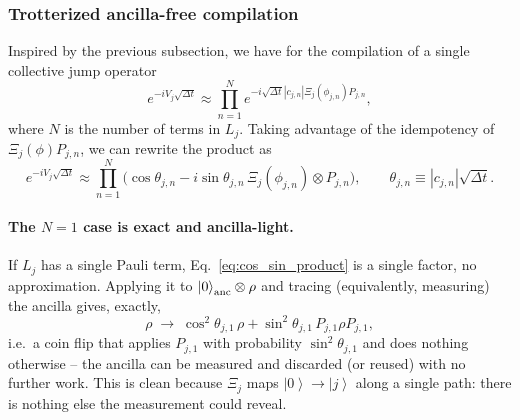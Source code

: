 \documentclass[11pt]{article}
\newcommand{\Dt}{\Delta t}
\renewcommand{\ket}[1]{\left| #1 \right\rangle}
\begin{document}
\subsubsection{Trotterized ancilla-free compilation}
Inspired by the previous subsection, we have for the compilation of a single
collective jump operator
\begin{equation}
    e^{-i V_{j} \sqrt{\Dt}} \approx \prod_{n=1}^{N} e^{-i \sqrt{\Dt} |c_{j,n}| \Xi_j(\phi_{j,n}) P_{j,n}},
\end{equation}
where $N$ is the number of terms in $L_j$. Taking advantage of the idempotency of $\Xi_j(\phi) P_{j,n}$, we can rewrite the product as
\begin{equation}\label{eq:cos_sin_product}
e^{-i V_{j} \sqrt{\Dt}} \approx \prod_{n=1}^{N} \Big(\cos\theta_{j,n}-i\sin\theta_{j,n}\,\Xi_j(\phi_{j,n})\otimes P_{j,n}\Big),\qquad \theta_{j,n}\equiv|c_{j,n}|\sqrt{\Dt}.
\end{equation}

\paragraph{The $N=1$ case is exact and ancilla-light.} If $L_j$ has a single Pauli term, Eq.~\eqref{eq:cos_sin_product} is a single factor, no approximation. Applying it to $\ket0_{\rm anc}\otimes\rho$ and tracing (equivalently, measuring) the ancilla gives, exactly,
\begin{equation}\label{eq:single_term_channel}
    \rho \;\longrightarrow\; \cos^2\theta_{j,1}\,\rho + \sin^2\theta_{j,1}\,P_{j,1}\rho P_{j,1},
\end{equation}
i.e.\ a coin flip that applies $P_{j,1}$ with probability $\sin^2\theta_{j,1}$ and does nothing otherwise -- the ancilla can be measured and discarded (or reused) with no further work. This is clean because $\Xi_j$ maps $\ket0\to\ket j$ along a single path: there is nothing else the measurement could reveal.
\end{document}
